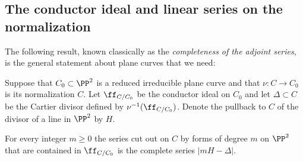 
\subsection{The conductor ideal and linear series on the normalization}

The following result, known classically as the \emph{completeness of the adjoint series}, is the general
statement about plane curves that we need:

\begin{theorem}\label{conductor completeness}
Suppose that $C_0 \subset \PP^2$ is a reduced irreducible plane curve and that $\nu : C \to C_0$ is its normalization $C$. Let 
$
\ff_{C/C_{0}}
$
be the conductor ideal on $C_{0}$ and let $\Delta\subset C$ be the Cartier divisor
defined by $\nu^{-1}(\ff_{C/C_{0}})$. Denote the pullback to $C$ of the divisor of a line
in $\PP^{2}$ by $H$.

For every integer $m\geq 0$ the series cut out on $C$ by forms of degree $m$
on $\PP^{2}$ that are contained in $\ff_{C/C_{0}}$ is the complete series
$|mH-\Delta|.$
\end{theorem}

